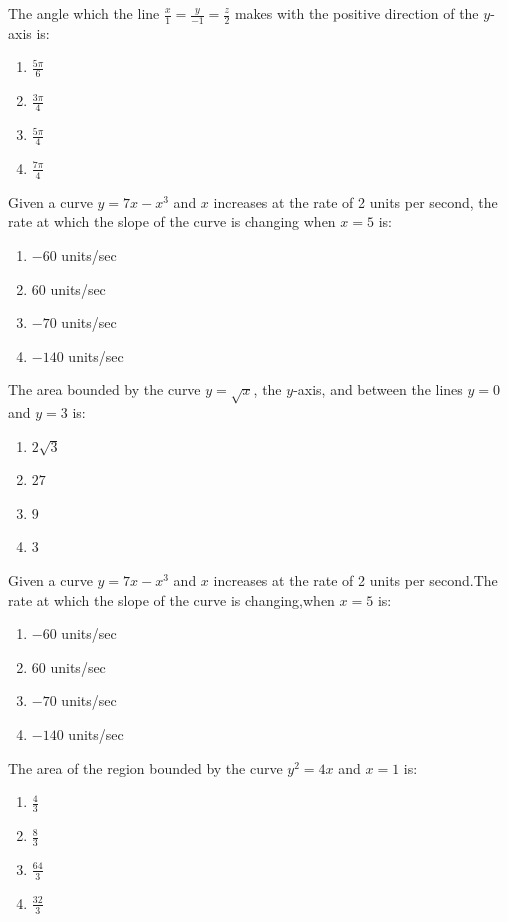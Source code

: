  \item The angle which the line $\frac{x}{1} = \frac{y}{-1} = \frac{z}{2}$ makes with the positive direction of the $y$-axis is:
    \begin{enumerate}[label=(\alph*)]
        \item $\frac{5\pi}{6}$
        \item $\frac{3\pi}{4}$
        \item $\frac{5\pi}{4}$
        \item $\frac{7\pi}{4}$
    \end{enumerate}
    \item Given a curve $y = 7x - x^3$ and $x$ increases at the rate of 2 units per second, the rate at which the slope of the curve is changing when $x = 5$ is:
    \begin{enumerate}[label=(\alph*)]
        \item $-60$ units/sec
        \item $60$ units/sec
        \item $-70$ units/sec
        \item $-140$ units/sec
    \end{enumerate}
     \item The area bounded by the curve $y = \sqrt{x}$, the $y$-axis, and between the lines $y = 0$ and $y = 3$ is:
    \begin{enumerate}[label=(\alph*)]
        \item $2\sqrt{3}$
        \item $27$
        \item $9$
        \item $3$
    \end{enumerate}



\item  Given a curve $ y =7x-x^3 $ and $x$ increases at the rate of 2 units per second.The rate  at which the slope of the curve  is changing,when $x=5$ is:

\begin{enumerate}
\item$-60$ units/sec
\item$60$ units/sec
\item$-70$ units/sec
\item$-140$ units/sec

\end{enumerate}


\item The area of the region bounded by the curve $y^2=4x$ and $x=1$ is:
\begin{enumerate}                                 
\item $\frac{4}{3}$    
\item $\frac{8}{3}$                                                    
 \item $\frac{64}{3}$                                                    
\item $\frac{32}{3}$                                                     
\end{enumerate}                                                       

